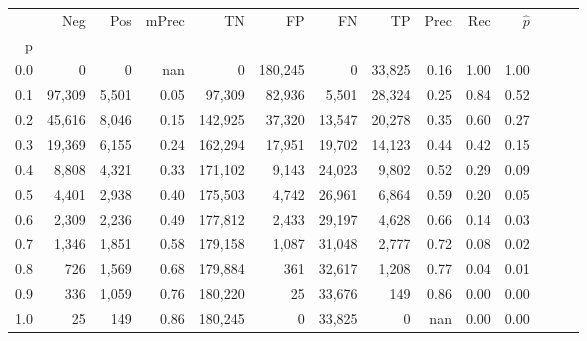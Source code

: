 \begin{tabular}{rrrrrrrrrrrrrr}
\toprule
{} &     Neg &    Pos & mPrec &       TN &       FP &      FN &      TP &  Prec &   Rec & $\hat{p}$ \\
p   &         &        &       &          &          &         &         &       &       &           \\
\midrule
0.0 &       0 &      0 &   nan &        0 &  180,245 &       0 &  33,825 &  0.16 &  1.00 &      1.00 \\
0.1 &  97,309 &  5,501 &  0.05 &   97,309 &   82,936 &   5,501 &  28,324 &  0.25 &  0.84 &      0.52 \\
0.2 &  45,616 &  8,046 &  0.15 &  142,925 &   37,320 &  13,547 &  20,278 &  0.35 &  0.60 &      0.27 \\
0.3 &  19,369 &  6,155 &  0.24 &  162,294 &   17,951 &  19,702 &  14,123 &  0.44 &  0.42 &      0.15 \\
0.4 &   8,808 &  4,321 &  0.33 &  171,102 &    9,143 &  24,023 &   9,802 &  0.52 &  0.29 &      0.09 \\
0.5 &   4,401 &  2,938 &  0.40 &  175,503 &    4,742 &  26,961 &   6,864 &  0.59 &  0.20 &      0.05 \\
0.6 &   2,309 &  2,236 &  0.49 &  177,812 &    2,433 &  29,197 &   4,628 &  0.66 &  0.14 &      0.03 \\
0.7 &   1,346 &  1,851 &  0.58 &  179,158 &    1,087 &  31,048 &   2,777 &  0.72 &  0.08 &      0.02 \\
0.8 &     726 &  1,569 &  0.68 &  179,884 &      361 &  32,617 &   1,208 &  0.77 &  0.04 &      0.01 \\
0.9 &     336 &  1,059 &  0.76 &  180,220 &       25 &  33,676 &     149 &  0.86 &  0.00 &      0.00 \\
1.0 &      25 &    149 &  0.86 &  180,245 &        0 &  33,825 &       0 &   nan &  0.00 &      0.00 \\
\bottomrule
\end{tabular}
